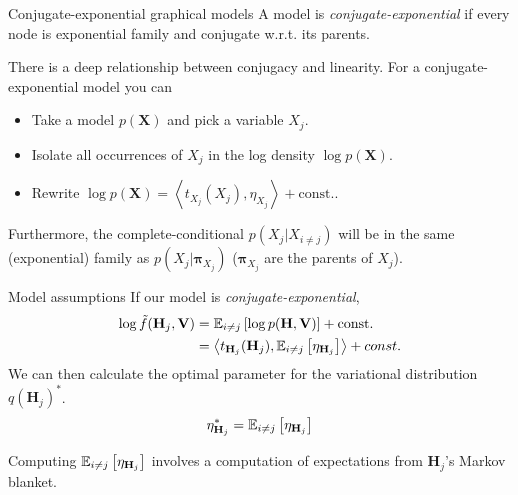 \documentclass[10pt, compress]{beamer}
\begin{document}
\begin{frame}{Conjugate-exponential graphical models}
  A model is \emph{conjugate-exponential}
  if every node is exponential family
  and conjugate w.r.t. its parents.
  \pause

  There is a deep relationship between conjugacy and linearity.
  \pause
  For a conjugate-exponential model you can
      \pause
  \begin{itemize}
    \item Take a model $p(\bm{X})$ and pick a variable $X_j$.
      \pause
    \item Isolate all occurrences of $X_j$ in the log density $\log p(\bm{X})$.
      \pause
    \item Rewrite $\log p(\bm{X}) = \left\langle t_{X_j}(X_j), \eta_{X_j}\right\rangle + \textrm{const.}$.
  \end{itemize}
      \pause
  Furthermore, the complete-conditional $p(X_j | X_{i \neq j})$ will be in the
  same (exponential) family as $p(X_j | \bm{\pi}_{X_j})$ ($\bm{\pi}_{X_j}$ are the parents of $X_j$).
\end{frame}

\begin{frame}{Model assumptions}
  If our model is \emph{conjugate-exponential},
  \begin{align*}
    \log\tilde{f}(\mathbf{H}_j, \mathbf{V}) &= \mathbb{E}_{i \neq j}\left[\log p(\mathbf{H}, \mathbf{V})\right] + \textrm{const.} \\
                                            &= \left\langle t_{\mathbf{H}_j}(\mathbf{H}_j), \mathbb{E}_{i \neq j}\left[\eta_{\mathbf{H}_j}\right]\right\rangle + const.
  \end{align*}
  \pause
  We can then calculate the optimal parameter
  for the variational distribution $q(\mathbf{H}_j)^*$.
  \begin{align*}
    \eta_{\mathbf{H}_j}^* = \mathbb{E}_{i \neq j}\left[\eta_{\mathbf{H}_j}\right]
  \end{align*}
  \pause

  Computing $\mathbb{E}_{i \neq j}\left[\eta_{\mathbf{H}_j}\right]$ involves
  a computation of expectations from $\mathbf{H}_j$'s Markov blanket.
\end{frame}
\end{document}
